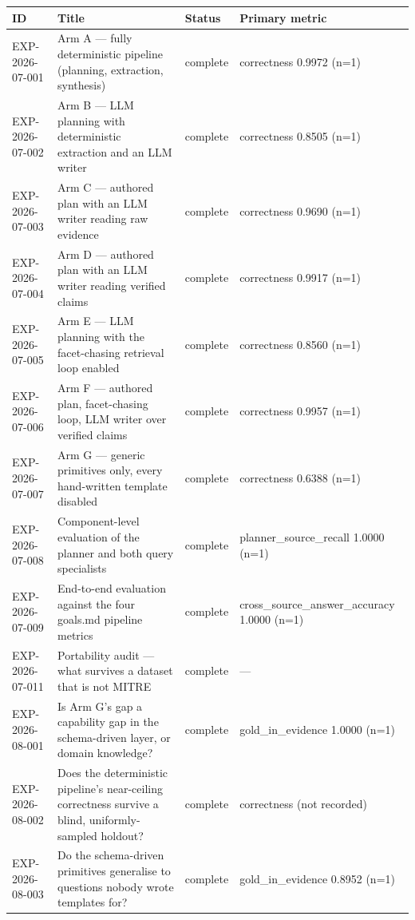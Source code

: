 \begin{tabular}{@{}L{0.15\textwidth}L{0.37\textwidth}L{0.13\textwidth}L{0.25\textwidth}@{}}
\toprule
ID & Title & Status & Primary metric \\
\midrule
EXP-2026-07-001 & Arm A --- fully deterministic pipeline (planning, extraction, synthesis) & complete & correctness 0.9972 (n=1) \\
EXP-2026-07-002 & Arm B --- LLM planning with deterministic extraction and an LLM writer & complete & correctness 0.8505 (n=1) \\
EXP-2026-07-003 & Arm C --- authored plan with an LLM writer reading raw evidence & complete & correctness 0.9690 (n=1) \\
EXP-2026-07-004 & Arm D --- authored plan with an LLM writer reading verified claims & complete & correctness 0.9917 (n=1) \\
EXP-2026-07-005 & Arm E --- LLM planning with the facet-chasing retrieval loop enabled & complete & correctness 0.8560 (n=1) \\
EXP-2026-07-006 & Arm F --- authored plan, facet-chasing loop, LLM writer over verified claims & complete & correctness 0.9957 (n=1) \\
EXP-2026-07-007 & Arm G --- generic primitives only, every hand-written template disabled & complete & correctness 0.6388 (n=1) \\
EXP-2026-07-008 & Component-level evaluation of the planner and both query specialists & complete & planner\_\allowbreak source\_\allowbreak recall 1.0000 (n=1) \\
EXP-2026-07-009 & End-to-end evaluation against the four goals.md pipeline metrics & complete & cross\_\allowbreak source\_\allowbreak answer\_\allowbreak accuracy 1.0000 (n=1) \\
EXP-2026-07-011 & Portability audit --- what survives a dataset that is not MITRE & complete & --- \\
EXP-2026-08-001 & Is Arm G's gap a capability gap in the schema-driven layer, or domain knowledge? & complete & gold\_\allowbreak in\_\allowbreak evidence 1.0000 (n=1) \\
EXP-2026-08-002 & Does the deterministic pipeline's near-ceiling correctness survive a blind, uniformly-sampled holdout? & complete & correctness (not recorded) \\
EXP-2026-08-003 & Do the schema-driven primitives generalise to questions nobody wrote templates for? & complete & gold\_\allowbreak in\_\allowbreak evidence 0.8952 (n=1) \\

\end{tabular}
